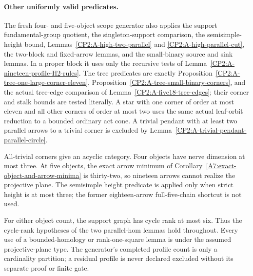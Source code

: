 \paragraph{Other uniformly valid predicates.}
The fresh four- and five-object scope generator also applies the support
fundamental-group quotient, the singleton-support comparison, the
semisimple-height bound, Lemmas~\ref{CP2:A-high-two-parallel} and
\ref{CP2:A-high-parallel-cut}, the two-block and fixed-arrow lemmas,
and the small-binary source and sink lemmas.  In a proper block it uses
only the recursive tests of Lemma~\ref{CP2:A-nineteen-profile-H2-rules}.
The tree predicates are exactly
Proposition~\ref{CP2:A-tree-one-large-corner-eleven},
Proposition~\ref{CP2:A-tree-small-binary-corners}, and the actual tree-edge
comparison of Lemma~\ref{CP2:A-five18-tree-edges}; their corner and stalk
bounds are tested literally.  A star with one corner of order at most
eleven and all other corners of order at most two uses the same actual
leaf-orbit reduction to a bounded ordinary act cone.  A trivial pendant
with at least two parallel arrows to a trivial corner is excluded by
Lemma~\ref{CP2:A-trivial-pendant-parallel-circle}.

All-trivial corners give an acyclic category.  Four objects have nerve
dimension at most three.  At five objects, the exact arrow minimum
of Corollary~\ref{A7:exact-object-and-arrow-minima} is thirty-two, so
nineteen arrows cannot realize the projective plane.  The semisimple
height predicate is applied only when strict height is at most three;
the former eighteen-arrow full-five-chain shortcut is not used.

For either object count, the support graph has cycle rank at most six.
Thus the cycle-rank hypotheses of the two parallel-hom lemmas hold
throughout.  Every use of a bounded-homology or rank-one-square lemma is
under the assumed projective-plane type.  The generator's completed
profile count is only a cardinality partition; a residual profile is
never declared excluded without its separate proof or finite gate.
